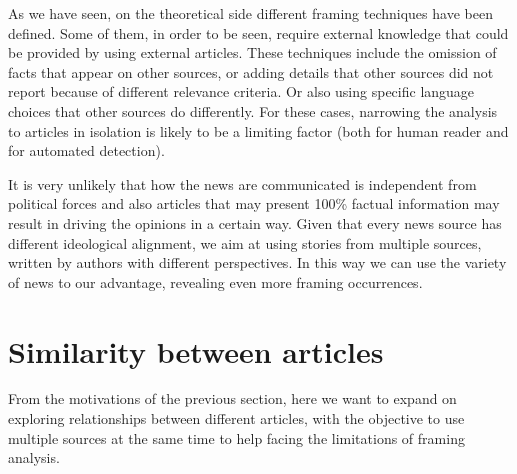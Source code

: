 As we have seen, on the theoretical side different framing techniques have been defined. Some of them, in order to be seen, require external knowledge that could be provided by using external articles.
These techniques include the omission of facts that appear on other sources, or adding details that other sources did not report because of different relevance criteria.
Or also using specific language choices that other sources do differently.
For these cases, narrowing the analysis to articles in isolation %
is likely to be a limiting factor (both for human reader and for automated detection).

It is very unlikely that how the news are communicated is independent from political forces and also articles that may present 100\% factual information may result in driving the opinions in a certain way.
Given that every news source has different ideological alignment, we aim at using stories from multiple sources, written by authors with different perspectives.
In this way we can use the variety of news to our advantage, revealing even more framing occurrences.





\section{Similarity between articles}
\label{sec:lit_relationships}

From the motivations of the previous section, here we want to expand on exploring relationships between different articles, with the objective to use multiple sources at the same time to help facing the limitations of framing analysis.


